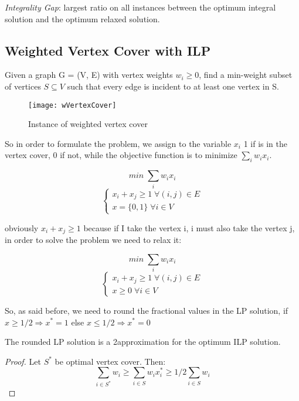 \emph{Integrality Gap}: largest ratio on all instances between the optimum integral solution and the optimum relaxed solution.

\subsection{Weighted Vertex Cover with ILP}

Given a graph G = (V, E) with vertex weights $w_{i} \geq 0$, find a min-weight subset of vertices $S \subseteq V$ such that every edge is incident to at least one vertex in S.

\begin{figure}[H]
    \centering
    \texttt{[image: wVertexCover]}
    \caption{Instance of weighted vertex cover}
\end{figure}

So in order to formulate the problem, we assign to the variable $x_{i}$ 1 if is in the vertex cover, 0 if not, while the objective function is to minimize $\sum_{i} w_{i}x_{i}$.


\[min \; \sum_{i} w_{i}x_{i}\]
\[\begin{cases} x_{i} + x_{j} \geq 1 \; \forall (i,j) \in E \\ x = \{0,1\} \; \forall i \in V\end{cases}\]

obviously $x_{i}+x_{j} \geq 1$ because if I take the vertex i, i must also take the vertex j, in order to solve the problem we need to relax it:

\[min \; \sum_{i} w_{i}x_{i}\]
\[\begin{cases} x_{i} + x_{j} \geq 1 \; \forall (i,j) \in E \\ x \geq 0 \; \forall i \in V\end{cases}\]

So, as said before, we need to round the fractional values in the LP solution, if $x \geq 1/2 \Rightarrow x^{*} = 1$ else $x \leq 1/2 \Rightarrow x^{*} = 0$

\begin{claim}
    The rounded LP solution is a 2approximation for the optimum ILP solution.
\end{claim}

\begin{proof}
    Let $S^{*}$ be optimal vertex cover. Then:
    \[\sum_{i \in S^{*}} w_{i} \geq \sum_{i \in S}w_{i}x_{i}^{*} \geq 1/2 \sum_{i \in S}w_{i}\]
\end{proof}

